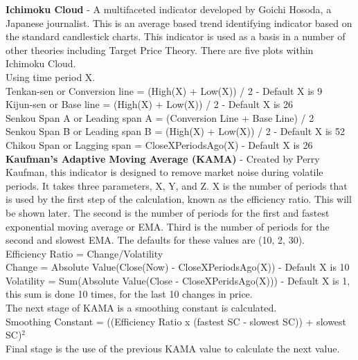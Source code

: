 \documentclass[12pt,a4paper]{article}
\begin{document}
\iffalse
[]
\fi

\textbf{Ichimoku Cloud} - A multifaceted indicator developed by Goichi Hosoda, a Japanese journalist. This is an average based trend identifying indicator based on the standard candlestick charts. This indicator is used as a basis in a number of other theories including Target Price Theory. There are five plots within Ichimoku Cloud.\\

Using time period X.\\
Tenkan-sen or Conversion line = (High(X) + Low(X)) / 2  - Default X is 9 \\
Kijun-sen or Base line = (High(X) + Low(X)) / 2 - Default X is 26 \\
Senkou Span A or Leading span A = (Conversion Line + Base Line) / 2 \\
Senkou Span B or Leading span B = (High(X) + Low(X)) / 2 - Default X is 52 \\
Chikou Span or Lagging span = CloseXPeriodsAgo(X) - Default X is 26\\

\iffalse
[]
\fi

\textbf{Kaufman's Adaptive Moving Average (KAMA)} - Created by Perry Kaufman, this indicator is designed to remove market noise during volatile periods. It takes three parameters, X, Y, and Z. X is the number of periods that is used by the first step of the calculation, known as the efficiency ratio. This will be shown later. The second is the number of periods for the first and fastest exponential moving average or EMA. Third is the number of periods for the second and slowest EMA. The defaults for these values are (10, 2, 30). \\

Efficiency Ratio = Change/Volatility\\
Change = Absolute Value(Close(Now) - CloseXPeriodsAgo(X)) - Default X is 10 \\
Volatility = Sum(Absolute Value(Close - CloseXPeridsAgo(X))) - Default X is 1, this sum is done 10 times, for the last 10 changes in price.\\

The next stage of KAMA is a smoothing constant is calculated. \\

Smoothing Constant = ((Efficiency Ratio x (fastest SC - slowest SC)) + slowest SC)$^2$\\

Final stage is the use of the previous KAMA value to calculate the next value. \\
\end{document}
